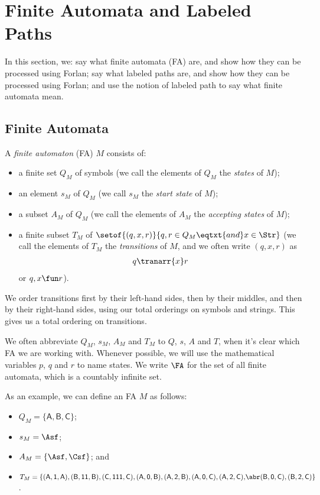 \section{Finite Automata and Labeled Paths}
\label{FiniteAutomataAndLabeledPaths}

In this section, we: say what finite automata (FA) are, and show how
they can be processed using Forlan; say what labeled paths are, and
show how they can be processed using Forlan; and use the notion of
labeled path to say what finite automata mean.

\subsection{Finite Automata}

A \emph{finite automaton} (FA) $M$ consists of:
\begin{itemize}
\item a finite set $Q_M$ of symbols (we call the elements of $Q_M$
the \emph{states} of $M$);

\item an element $s_M$ of $Q_M$ (we call $s_M$ the \emph{start state}
of $M$);

\item a subset $A_M$ of $Q_M$ (we call the elements of $A_M$ the
\emph{accepting states} of $M$);

\item a finite subset $T_M$ of $\setof{(q,x,r)}{q,r\in Q_M\eqtxt{and}
x\in\Str}$ (we call the elements of $T_M$ the \emph{transitions} of
$M$, and we often write $(q, x, r)$ as
\begin{gather*}
q\tranarr{x}r
\end{gather*}
or $q,x\fun r$).
\end{itemize}

We order transitions first by their left-hand sides, then by their
middles, and then by their right-hand sides, using our total orderings
on symbols and strings.  This gives us a total ordering on
transitions.

We often abbreviate $Q_M$, $s_M$, $A_M$ and $T_M$ to $Q$,
$s$, $A$ and $T$, when it's clear which FA we are
working with.  Whenever possible, we will use the mathematical
variables $p$, $q$ and $r$ to name states.
We write $\FA$ for the set of all finite automata, which is a
countably infinite set.

As an example, we can define an FA $M$ as follows:
\begin{itemize}
\item $Q_M=\{\mathsf{A,B,C}\}$;

\item $s_M=\Asf$;

\item $A_M=\{\Asf, \Csf\}$; and

\item $T_M=\{\mathsf{(A,1,A), (B,11,B), (C,111,C),
  (A,0,B),(A,2,B),(A,0,C),(A,2,C),}\abr\mathsf{(B,0,C), (B,2,C)}\}$.
\end{itemize}

